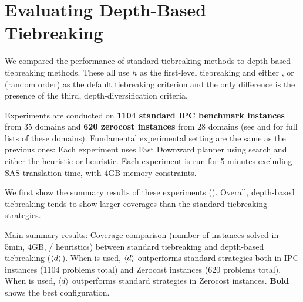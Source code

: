 \section{Evaluating Depth-Based Tiebreaking}
\label{sec:depth-based-evaluation}



We compared the performance of standard tiebreaking methods to depth-based tiebreaking methods. These all use $h$
as the first-level tiebreaking and either \fifo, \lifo or \ro (random order) as the default tiebreaking criterion
and the only difference is the presence of the third, depth-diversification criteria.

Experiments are conducted on \textbf{1104 standard IPC benchmark
instances} from 35 domains  and \textbf{620 zerocost instances} from 28 domains (see  and  for full lists of these domains). 
Fundamental experimental setting are the same as the previous ones:
Each experiment uses Fast Downward planner using \astar search and either the \lmcut heuristic or \mands heuristic.
Each experiment is run for 5 minutes excluding SAS translation time, with 4GB memory constraints.

We first show the summary results of these experiments ().
Overall, depth-based tiebreaking tends to show larger coverages than the
standard tiebreaking strategies.

\begin{table}[htb]
 {
 \centering
 \setlength{\tabcolsep}{3pt}
 
 \caption{
 Main summary results: Coverage comparison (number of instances solved in 5min, 4GB, \lmcut/\mands
 heuristics) between standard tiebreaking and depth-based tiebreaking
 (${\left<d\right>}$). When \lmcut is used, ${\left<d\right>}$ outperforms standard strategies both in IPC
 instances (1104 problems total) and Zerocost instances (620 problems
 total). When \mands is used, ${\left<d\right>}$ outperforms standard strategies
 in Zerocost instances. \textbf{Bold} shows the best configuration.}
 \label{tbl:depth-summary}
 }
\end{table}

